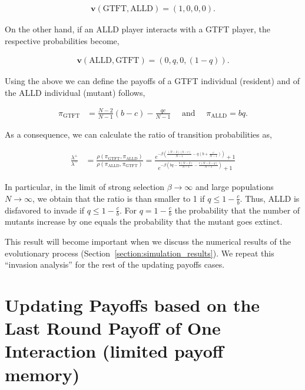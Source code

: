 \documentclass[11pt]{article}
\theoremstyle{plainCl1}
\theoremstyle{plainCl2}
\begin{document}
\begin{align*}
    \mathbf{v}(\text{GTFT}, \text{ALLD}) = (1, 0, 0, 0).
\end{align*}

On the other hand, if an ALLD player interacts with a GTFT player, the
respective probabilities become,

\begin{align*}
  \mathbf{v}(\text{ALLD}, \text{GTFT}) = (0, q, 0, (1 - q)).
\end{align*}

Using the above we can define the payoffs of a GTFT individual (resident)
and of the ALLD individual (mutant) follows,

\begin{align*}
  \displaystyle \pi_{\text{GTFT}} & = \displaystyle \frac{N\!-\!2}{N-1} (b - c)  -	\displaystyle\frac{q c}{N-1} \quad \text{ and } \quad \displaystyle \pi_{\text{ALLD}}  = \displaystyle b q.
\end{align*}

As a consequence, we can calculate the ratio of transition probabilities as,

\begin{align*}
    \frac{\lambda^{+}}{\lambda^{-}} & = \frac{\rho(\pi_{\text{GTFT}}, \pi_{\text{ALLD}})}{\rho(\pi_{\text{ALLD}}, \pi_{\text{GTFT}})}  = \frac{e^{-\beta \left(\frac{(N-2) (b-c)}{N-1} - q (b + \frac{c}{N-1})\right)}+1}
    {e^{-\beta\left(b q - \frac{b (N - 2)}{N-1} - \frac{c (N - 2 - q)}{N-1}\right)}+1}
\end{align*}

In particular, in the limit of strong selection \(\beta \rightarrow \infty\)
and large populations \(N \rightarrow \infty\), we obtain that the ratio is than
smaller to 1 if \(q \leq 1 - \frac{c}{b}\). Thus, ALLD is disfavored to invade
if \(q \leq 1 - \frac{c}{b}\). For \(q = 1 -\frac{c}{b}\) the probability that
the number of mutants increase by one equals the probability that the mutant
goes extinct.

This result will become important when we discuss the numerical results of the
evolutionary process (Section~\ref{section:simulation_results}). We repeat this
``invasion analysis'' for the rest of the updating payoffs cases.

\section{Updating Payoffs based on the Last Round Payoff of One Interaction (limited payoff memory)}\label{section:limited_memory}
\end{document}
